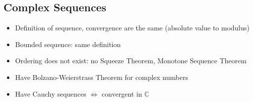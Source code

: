 \subsection*{Complex Sequences}
\begin{itemize}
      \item Definition of sequence, convergence are the same (absolute value to modulus)
      \item Bounded sequence: same definition
      \item Ordering does not exist: no Squeeze Theorem, Monotone Sequence Theorem
      \item Have Bolzano-Weierstrass Theorem for complex numbers
      \item Have Cauchy sequences $\iff$ convergent in $\mathbb{C}$
\end{itemize}

